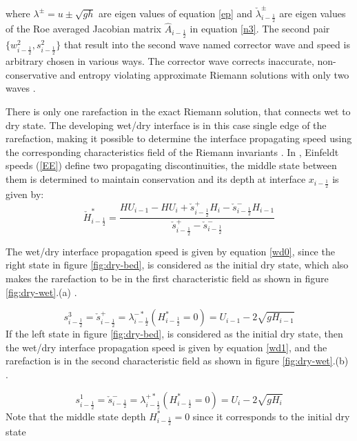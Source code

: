 \documentclass[11pt,a4paper]{article}
\begin{document}
	where $\lambda^{\pm} = u\pm \sqrt{gh}$ are eigen values of equation \eqref{ep} and $\check{\lambda}_{i-\frac{1}{2}}^{\pm}$ are eigen values of the Roe averaged Jacobian matrix $\hat{A}_{i-\frac{1}{2}}$ in equation \eqref{n3}. The second pair $	\{w^{2}_{i-\frac{1}{2}},s^{2}_{i-\frac{1}{2}}\}$  that result into the second wave named corrector wave and speed is arbitrary chosen in various ways. The corrector wave corrects inaccurate, non-conservative and entropy violating approximate Riemann solutions with only two waves \cite{be-ge-le-ma:2011}.
	
	
	There is only one rarefaction in the exact Riemann solution, that connects wet to dry state. The developing wet/dry interface is in this case single edge of the rarefaction, making it possible to determine the interface propagating speed using the corresponding characteristics field of the Riemann invariants \cite{le-ge-be:2011}. In  \citet{george2006finite,ge:2008}, Einfeldt speeds (\eqref{EE})  define two propagating discontinuities, the  middle state between them is determined to maintain conservation and its depth at interface $x_{i-\frac{1}{2}}$ is given by:
	\begin{equation}
		\check{H}^{*}_{i-\frac{1}{2}} = \frac{HU_{i-1} -HU_{i} + \check{s}_{i-\frac{1}{2}}^{+}H_{i} -\check{s}_{i-\frac{1}{2}}^{-} H_{i-1}  }{\check{s}_{i-\frac{1}{2}}^{+} - \check{s}_{i-\frac{1}{2}}^{-}  }
	\end{equation}
	
	The wet/dry interface propagation  speed  is given by equation \eqref{wd0}, since the right state in figure \ref{fig:dry-bed}, is considered as the initial dry state, which also makes the rarefaction to be in the first characteristic field as shown in figure \ref{fig:dry-wet}.(a)  \cite{ge:2008}.
	
	\begin{equation}
		s_{i-\frac{1}{2}}^{3} = \check{s}_{i-\frac{1}{2}}^{+} = \lambda_{i-\frac{1}{2}}^{-*}(H^{*}_{i-\frac{1}{2}}=0)= U_{i-1} - 2\sqrt{gH_{i-1}}
		\label{wd0}
	\end{equation}
	If the left state in figure \ref{fig:dry-bed}, is considered as the initial dry state, then the  wet/dry interface propagation  speed  is given by equation \eqref{wd1}, and the  rarefaction is in the second characteristic field  as shown in figure \ref{fig:dry-wet}.(b)  \cite{ge:2008}.
	
	\begin{equation}
		s_{i-\frac{1}{2}}^{1} = \check{s}_{i-\frac{1}{2}}^{-} = \lambda_{i-\frac{1}{2}}^{+*}(H^{*}_{i-\frac{1}{2}}=0)= U_{i} - 2\sqrt{gH_{i}}
		\label{wd1}
	\end{equation}
	Note that the middle state depth $H^{*}_{i-\frac{1}{2}}=0$ since it corresponds to the initial dry state
	
\end{document}
